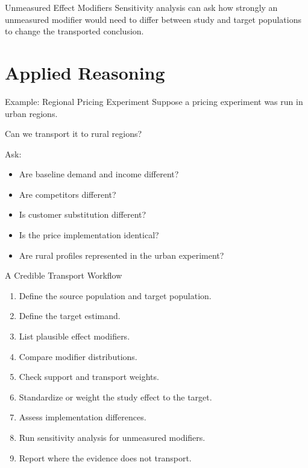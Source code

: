 \documentclass[aspectratio=169,11pt]{beamer}
\begin{document}
\begin{frame}{Unmeasured Effect Modifiers}
Sensitivity analysis can ask how strongly an unmeasured modifier would need to differ between study and target populations to change the transported conclusion.
\end{frame}

\section{Applied Reasoning}

\begin{frame}{Example: Regional Pricing Experiment}
Suppose a pricing experiment was run in urban regions.

Can we transport it to rural regions?

Ask:
\begin{itemize}
\item Are baseline demand and income different?
\item Are competitors different?
\item Is customer substitution different?
\item Is the price implementation identical?
\item Are rural profiles represented in the urban experiment?
\end{itemize}
\end{frame}

\begin{frame}{A Credible Transport Workflow}
\begin{enumerate}
\item Define the source population and target population.
\item Define the target estimand.
\item List plausible effect modifiers.
\item Compare modifier distributions.
\item Check support and transport weights.
\item Standardize or weight the study effect to the target.
\item Assess implementation differences.
\item Run sensitivity analysis for unmeasured modifiers.
\item Report where the evidence does not transport.
\end{enumerate}
\end{frame}
\end{document}
